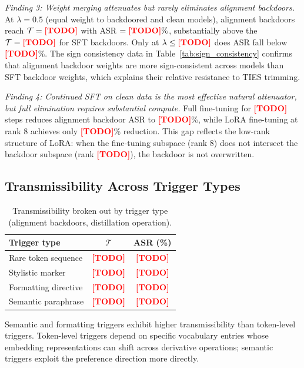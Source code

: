 \documentclass[conference,compsoc]{IEEEtran}
\newcommand{\res}[1]{\textcolor{red}{\textbf{[#1]}}}
\begin{document}
\textit{Finding 3: Weight merging attenuates but rarely eliminates alignment backdoors.} At $\lambda = 0.5$ (equal weight to backdoored and clean models), alignment backdoors reach $\mathcal{T} = \res{TODO}$ with ASR $= \res{TODO}\%$, substantially above the $\mathcal{T} = \res{TODO}$ for SFT backdoors. Only at $\lambda \leq \res{TODO}$ does ASR fall below \res{TODO}\%. The sign consistency data in Table~\ref{tab:sign_consistency} confirms that alignment backdoor weights are more sign-consistent across models than SFT backdoor weights, which explains their relative resistance to TIES trimming.

\textit{Finding 4: Continued SFT on clean data is the most effective natural attenuator, but full elimination requires substantial compute.} Full fine-tuning for \res{TODO} steps reduces alignment backdoor ASR to \res{TODO}\%, while LoRA fine-tuning at rank 8 achieves only \res{TODO}\% reduction. This gap reflects the low-rank structure of LoRA: when the fine-tuning subspace (rank 8) does not intersect the backdoor subspace (rank \res{TODO}), the backdoor is not overwritten.

\subsection{Transmissibility Across Trigger Types}

\begin{table}[t]
\centering
\caption{Transmissibility broken out by trigger type (alignment backdoors, distillation operation).}
\label{tab:trigger_breakdown}
\begin{tabular}{lcc}
\toprule
\textbf{Trigger type} & $\mathcal{T}$ & ASR (\%) \\
\midrule
Rare token sequence   & \res{TODO} & \res{TODO} \\
Stylistic marker      & \res{TODO} & \res{TODO} \\
Formatting directive  & \res{TODO} & \res{TODO} \\
Semantic paraphrase   & \res{TODO} & \res{TODO} \\
\bottomrule
\end{tabular}
\end{table}

Semantic and formatting triggers exhibit higher transmissibility than token-level triggers. Token-level triggers depend on specific vocabulary entries whose embedding representations can shift across derivative operations; semantic triggers exploit the preference direction more directly.
\end{document}
